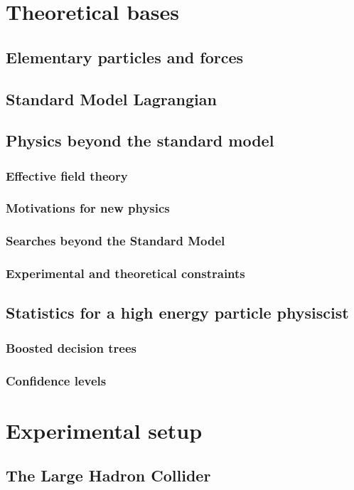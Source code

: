 \mainmatter
\chapter[An introduction to the theory]{Theoretical bases}
\section[SM]{Elementary particles and forces}
\section[SML]{Standard Model Lagrangian}
\section[BSM]{Physics beyond the standard model}
\subsection[EFT]{Effective field theory}
\subsection[BSM]{Motivations for new physics}
\subsection[BSMsearch]{Searches beyond the Standard Model}
\subsection{Experimental and theoretical constraints}
\section[Statistics]{Statistics for a high energy particle physiscist}
\subsection[BDT]{Boosted decision trees}
\subsection[CL]{Confidence levels }

\chapter[Experiment]{Experimental setup}
\section[LHC]{The Large Hadron Collider}
